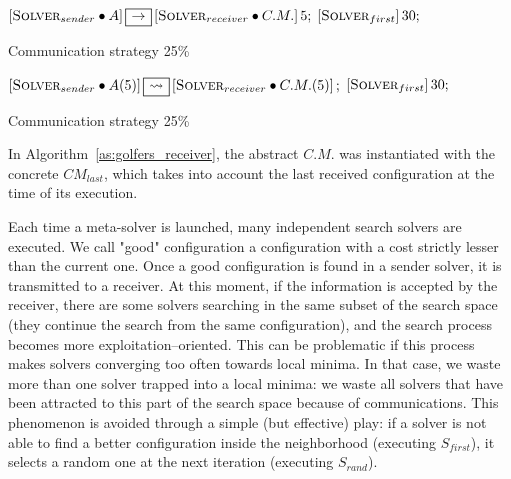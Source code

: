 \begin{algorithm}
\dontprintsemicolon
\SetNoline
$\left[\eqsolverposl{sender}\posldot A\right] \onetoone \left[\eqsolverposl{receiver}\posldot C.M.\right]5;$\;
$\left[\textbf{{\sc Solver}}_{first}\right]30;$
\caption{Communication strategy \oneTone{} 25\%}\label{comm:golfers_1_1-1_25}
\end{algorithm}

\begin{algorithm}
\dontprintsemicolon
\SetNoline
$\left[\eqsolverposl{sender}\posldot A(5)\right] \oneton \left[\eqsolverposl{receiver}\posldot C.M.(5)\right];$\;
$\left[\textbf{{\sc Solver}}_{first}\right]30;$
\caption{Communication strategy \oneTn{} 25\%}\label{comm:golfers_1_1-n_25}
\end{algorithm}

In Algorithm~\ref{as:golfers_receiver}, the abstract \opch{} $C.M.$ was instantiated with the concrete \opch{} $CM_{last}$, which takes into account the last received configuration at the time of its execution.

Each time a \posl{} meta-solver is launched, many independent search solvers are executed. We call "good" configuration a configuration %
with a cost strictly lesser than the current one. Once a good configuration is found in a sender solver, it is transmitted to a receiver. At this moment, if the information is accepted by the receiver, there are some solvers searching in the same subset of the search space (\ie they continue the search from the same configuration), and the search process becomes more exploitation--oriented. This can be problematic if this process makes solvers converging too often towards local minima. In that case, we waste more than one solver trapped into a local minima: we waste all solvers that have been attracted to this part of the search space because of communications. This phenomenon is avoided through a simple (but effective) play: if a solver is not able to find a better configuration inside the neighborhood (executing $S_{first}$), it selects a random one at the next iteration (executing $S_{rand}$).

